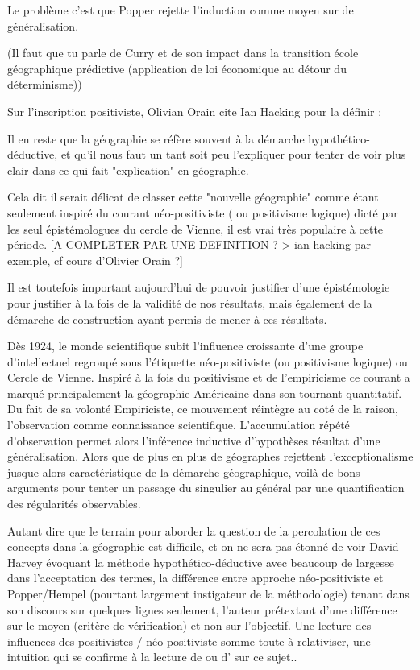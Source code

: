 {Le problème c'est que Popper rejette l'induction comme moyen sur de généralisation.

(Il faut que tu parle de Curry et de son impact dans la transition école géographique prédictive (application de loi économique au détour du déterminisme))

Sur l'inscription positiviste, Olivian Orain cite Ian Hacking pour la définir : 



Il en reste que la géographie se réfère souvent à la démarche hypothético-déductive, et qu'il nous faut un tant soit peu l'expliquer pour tenter de voir plus clair dans ce qui fait "explication" en géographie.

Cela dit il serait délicat de classer cette "nouvelle géographie" comme étant seulement inspiré du courant néo-positiviste ( ou positivisme logique) dicté par les seul épistémologues du cercle de Vienne, il est vrai très populaire à cette période. [A COMPLETER PAR UNE DEFINITION ? > ian hacking par exemple, cf cours d'Olivier Orain ?] 

 Il est toutefois important aujourd'hui de pouvoir justifier d'une épistémologie pour justifier à la fois de la validité de nos résultats, mais également de la démarche de construction ayant permis de mener à ces résultats.


Dès 1924, le monde scientifique subit l'influence croissante d'une groupe d'intellectuel regroupé sous l'étiquette néo-positiviste (ou positivisme logique) ou Cercle de Vienne. Inspiré à la fois du positivisme et de l'empiricisme ce courant a marqué principalement la géographie Américaine dans son tournant quantitatif. Du fait de sa volonté Empiriciste, ce mouvement réintègre au coté de la raison, l'observation comme connaissance scientifique. L'accumulation répété d'observation permet alors l'inférence inductive d'hypothèses résultat d'une généralisation. Alors que de plus en plus de géographes rejettent l'exceptionalisme jusque alors caractéristique de la démarche géographique, voilà de bons arguments pour tenter un passage du singulier au général par une quantification des régularités observables.

Autant dire que le terrain pour aborder la question de la percolation de ces concepts dans la géographie est difficile, et on ne sera pas étonné de voir David Harvey évoquant la méthode hypothético-déductive avec beaucoup de largesse dans l'acceptation des termes, la différence entre approche néo-positiviste et Popper/Hempel (pourtant largement instigateur de la méthodologie) tenant dans son discours sur quelques lignes seulement, l'auteur prétextant d'une différence sur le moyen (critère de vérification) et non sur l'objectif. \autocite{Johnston2002} Une lecture des influences des positivistes / néo-positiviste somme toute à relativiser, une intuition qui se confirme à la lecture de \autocite{Dauphine2003} ou d'\autocite{Orain} sur ce sujet..

}

